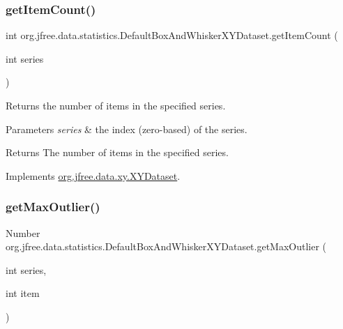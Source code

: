 \subsubsection{\texorpdfstring{get\+Item\+Count()}{getItemCount()}}
{\footnotesize\ttfamily int org.\+jfree.\+data.\+statistics.\+Default\+Box\+And\+Whisker\+X\+Y\+Dataset.\+get\+Item\+Count (\begin{DoxyParamCaption}\item[{int}]{series }\end{DoxyParamCaption})}

Returns the number of items in the specified series.


\begin{DoxyParams}{Parameters}
{\em series} & the index (zero-\/based) of the series.\\
\hline
\end{DoxyParams}
\begin{DoxyReturn}{Returns}
The number of items in the specified series. 
\end{DoxyReturn}


Implements \mbox{\hyperlink{interfaceorg_1_1jfree_1_1data_1_1xy_1_1_x_y_dataset_ae81f9de91dfcae45028fc8a486a119da}{org.\+jfree.\+data.\+xy.\+X\+Y\+Dataset}}.

\mbox{\label{classorg_1_1jfree_1_1data_1_1statistics_1_1_default_box_and_whisker_x_y_dataset_a3bf4cfe81f62aa7bcea3b0abf9e045d3}} 
\subsubsection{\texorpdfstring{get\+Max\+Outlier()}{getMaxOutlier()}}
{\footnotesize\ttfamily Number org.\+jfree.\+data.\+statistics.\+Default\+Box\+And\+Whisker\+X\+Y\+Dataset.\+get\+Max\+Outlier (\begin{DoxyParamCaption}\item[{int}]{series,  }\item[{int}]{item }\end{DoxyParamCaption})}

